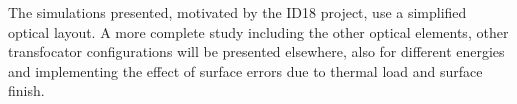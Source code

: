 \documentclass{iucr}              %
\newcommand{\todo}[1]{{\color{red}[TODO: "#1'']}}
\begin{document}



        


The simulations presented, motivated by the ID18 project, use a simplified optical layout. A more complete study including the other optical elements, other transfocator configurations will be presented elsewhere, also for different energies and implementing the effect of surface errors due to thermal load and surface finish. 

\end{document}
